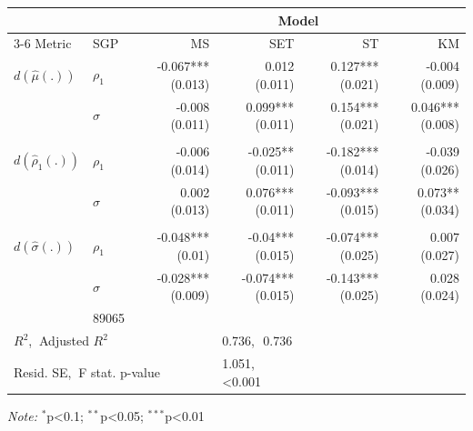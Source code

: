 \begin{tabular}{@{\extracolsep{\fill}}l|l|rrrr}
\toprule\toprule
\multicolumn{2}{l}{} & \multicolumn{4}{c}{{Model}} \\ 
\cmidrule(lr){3-6}
Metric & SGP & MS & SET & ST & KM \\ 
\midrule\addlinespace[2.5pt]
\(d(\hat{\mu}(.))\) & \(\rho_{1}\) & -0.067*** (0.013) & 0.012 (0.011) & 0.127*** (0.021) & -0.004 (0.009) \\ 
 & \(\sigma\) & -0.008 (0.011) & 0.099*** (0.011) & 0.154*** (0.021) & 0.046*** (0.008) \\ 
 &  &  &  &  &  \\ 
\(d(\hat{\rho}_1(.))\) & \(\rho_{1}\) & -0.006 (0.014) & -0.025** (0.011) & -0.182*** (0.014) & -0.039 (0.026) \\ 
 & \(\sigma\) & 0.002 (0.013) & 0.076*** (0.011) & -0.093*** (0.015) & 0.073** (0.034) \\ 
 &  &  &  &  &  \\ 
\(d(\hat{\sigma}(.))\) & \(\rho_{1}\) & -0.048*** (0.01) & -0.04*** (0.015) & -0.074*** (0.025) & 0.007 (0.027) \\ 
 & \(\sigma\) & -0.028*** (0.009) & -0.074*** (0.015) & -0.143*** (0.025) & 0.028 (0.024) \\ 
\midrule\addlinespace[2.5pt]
\multicolumn{3}{l|}{Observations} & \multicolumn{1}{l}{89065} \\
\multicolumn{3}{l|}{$R^2$,$~$ Adjusted $R^2$} & \multicolumn{1}{l}{0.736,$~~~$0.736} \\
\multicolumn{3}{l|}{Resid. SE,$~$ F stat. p-value} & \multicolumn{1}{l}{1.051,$~~~$<0.001} \\
\bottomrule\bottomrule
\end{tabular}
\begin{minipage}{\linewidth}\centering
\vspace{.05em}
\emph{Note:}  \(^{*}\)p\textless{}0.1; \(^{**}\)p\textless{}0.05; \(^{***}\)p\textless{}0.01\\
\end{minipage}
